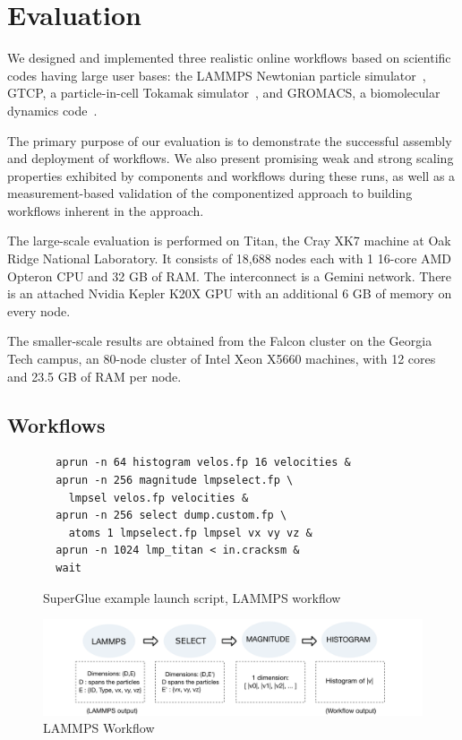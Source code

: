 \section{Evaluation}
\label{s:eval}

We designed and implemented three realistic online workflows based on
scientific codes having large user bases: the LAMMPS Newtonian particle
simulator~\cite{plimpton:1997:lammps}, GTCP, a particle-in-cell Tokamak
simulator~\cite{lin:gtc}, and GROMACS,
a biomolecular dynamics code~\cite{hess2008gromacs}.

The primary purpose of our evaluation is to demonstrate the
successful assembly and deployment of \sys workflows. We also present promising
weak and strong scaling properties exhibited by \sys components
and workflows during these runs, as well as a measurement-based validation of
the componentized approach to building workflows inherent in the \sys approach.

The large-scale evaluation is performed on Titan, the Cray XK7 machine at Oak Ridge
National Laboratory. It consists of 18,688 nodes each with 1 16-core AMD
Opteron CPU and 32 GB of RAM. The interconnect is a Gemini network. There is an
attached Nvidia Kepler K20X GPU with an additional 6 GB of memory on every
node.

The smaller-scale results are obtained from the Falcon cluster
on the Georgia Tech campus, an 80-node cluster of Intel Xeon X5660 machines,
with 12 cores and 23.5 GB of RAM per node. 


\subsection{Workflows}

\begin{figure}
  \begin{lstlisting}
  aprun -n 64 histogram velos.fp 16 velocities &
  aprun -n 256 magnitude lmpselect.fp \
    lmpsel velos.fp velocities &
  aprun -n 256 select dump.custom.fp \
    atoms 1 lmpselect.fp lmpsel vx vy vz &
  aprun -n 1024 lmp_titan < in.cracksm &
  wait
  \end{lstlisting}
  \vspace{-0.15in}
  \caption{SuperGlue example launch script, LAMMPS workflow}
  \label{fig:launch-script}
  \vspace{-0.10in}
\end{figure}
\fi

\begin{figure}
  \vspace{-0.10in}
  \includegraphics[width=\linewidth]{fig/wflow3}
  \vspace{-0.35in}
  \caption{LAMMPS Workflow}
  \label{fig:lammps-workflow}
  \vspace{-0.05in}
\end{figure}

